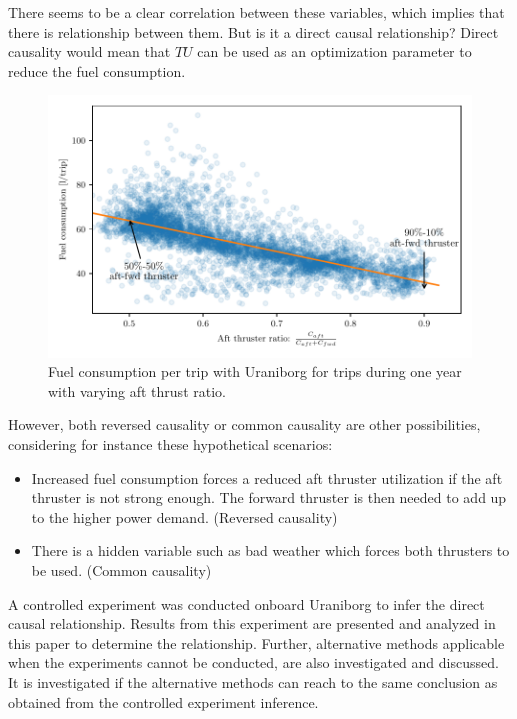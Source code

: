 There seems to be a clear correlation between these variables,  which implies that there is relationship between them. But is it a direct causal relationship? Direct causality would mean that $TU$ can be used as an optimization parameter to reduce the fuel consumption.
\begin{figure}[!htb]
    \centering
    \includegraphics[width=\textwidth]{figures/correlation.pdf}
    \caption{Fuel consumption per trip with Uraniborg for trips during one year with varying aft thrust ratio.}
    \label{fig:fuel_consumption_correlation}
\end{figure}
However, both reversed causality or common causality are other possibilities, considering for instance these hypothetical scenarios:
\begin{itemize}
    \item Increased fuel consumption forces a reduced aft thruster utilization if the aft thruster is not strong enough. The forward thruster is then needed to add up to the higher power demand. (Reversed causality)

    \item There is a hidden variable such as bad weather which forces both thrusters to be used. (Common causality)
\end{itemize}

A controlled experiment was conducted onboard Uraniborg to infer the direct causal relationship. Results from this experiment are presented and analyzed in this paper to determine the relationship. Further, alternative methods applicable when the experiments cannot be conducted, are also investigated and discussed. It is investigated if the alternative methods can reach to the same conclusion as obtained from the controlled experiment inference. 